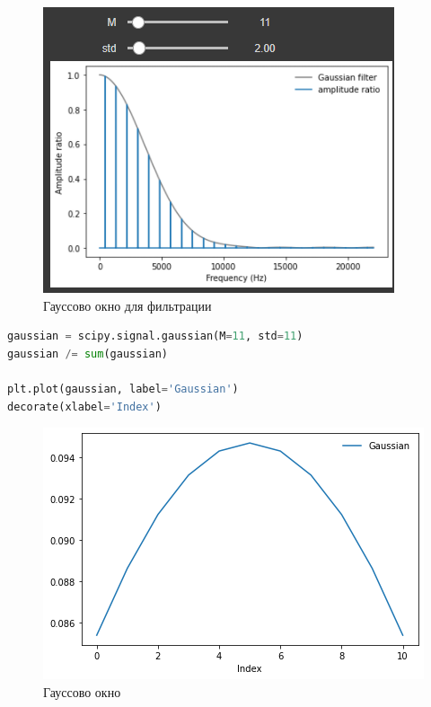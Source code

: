 \begin{figure}[H]
	\begin{center}
		\includegraphics[scale=1]{fig/lab08/lab08_5_0.png}
		\caption{Гауссово окно для фильтрации}
	\end{center}
\end{figure}

\begin{lstlisting}[language=Python]
gaussian = scipy.signal.gaussian(M=11, std=11)
gaussian /= sum(gaussian)

plt.plot(gaussian, label='Gaussian')
decorate(xlabel='Index')
\end{lstlisting}
\begin{figure}[H]
	\begin{center}
		\includegraphics[scale=0.7]{fig/lab08/lab08_6_0.png}
		\caption{Гауссово окно}
	\end{center}
\end{figure}


